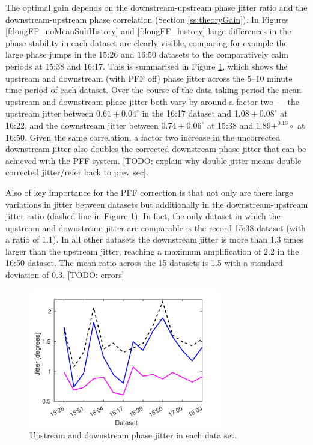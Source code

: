 The optimal gain depends on the downstream-upstream phase jitter ratio and the downstream-upstream phase correlation (Section \ref{ss:theoryGain}). In Figures \ref{f:longFF_noMeanSubHistory} and \ref{f:longFF_history} large differences in the phase stability in each dataset are clearly visible, comparing for example the large phase jumps in the 15:26 and 16:50 datasets to the comparatively calm periods at 15:38 and 16:17. This is summarised in Figure \ref{f:longFF_jitFFOff}, which shows the upstream and downstream (with PFF off) phase jitter across the 5--10 minute time period of each dataset. Over the course of the data taking period the mean upstream and downstream phase jitter both vary by around a factor two --- the upstream jitter between \(0.61\pm0.04^\circ\) in the 16:17 dataset and \(1.08\pm0.08^\circ\) at 16:22, and the downstream jitter between \(0.74\pm0.06^\circ\) at 15:38 and \(1.89\pm^0.13\circ\) at 16:50. Given the same correlation, a factor two increase in the uncorrected downstream jitter also doubles the corrected downstream phase jitter that can be achieved with the PFF system. [TODO: explain why double jitter means double corrected jitter/refer back to prev sec].

Also of key importance for the PFF correction is that not only are there large variations in jitter between datasets but additionally in the downstream-upstream jitter ratio (dashed line in Figure \ref{f:longFF_jitFFOff}). In fact, the only dataset in which the upstream and downstream jitter are comparable is the record 15:38 dataset (with a ratio of 1.1). In all other datasets the downstream jitter is more than 1.3 times larger than the upstream jitter, reaching a maximum amplification of 2.2 in the 16:50 dataset. The mean ratio across the 15 datasets is 1.5 with a standard deviation of 0.3. [TODO: errors]

\begin{figure}
  \centering
  \includegraphics[width=0.75\textwidth]{Figures/feedforward/longFF_jitDatSetFFOff}
  \caption{Upstream and downstream phase jitter in each data set.}
  \label{f:longFF_jitFFOff}
\end{figure}

